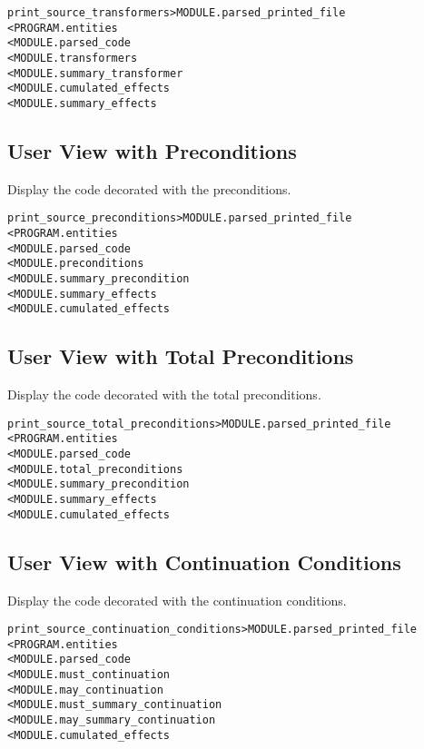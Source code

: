 \documentclass[a4paper]{report}
\newenvironment{PipsMake}{\begin{alltt}}{\end{alltt}}
\begin{document}
\begin{PipsMake}
print_source_transformers         > MODULE.parsed_printed_file
        < PROGRAM.entities
        < MODULE.parsed_code
        < MODULE.transformers
        < MODULE.summary_transformer
        < MODULE.cumulated_effects
        < MODULE.summary_effects
\end{PipsMake}

\subsection{User View with Preconditions}

Display the code decorated with the preconditions.

\begin{PipsMake}
print_source_preconditions        > MODULE.parsed_printed_file
        < PROGRAM.entities
        < MODULE.parsed_code
        < MODULE.preconditions
        < MODULE.summary_precondition
        < MODULE.summary_effects
        < MODULE.cumulated_effects
\end{PipsMake}

\subsection{User View with Total Preconditions}

Display the code decorated with the total preconditions.

\begin{PipsMake}
print_source_total_preconditions        > MODULE.parsed_printed_file
        < PROGRAM.entities
        < MODULE.parsed_code
        < MODULE.total_preconditions
        < MODULE.summary_precondition
        < MODULE.summary_effects
        < MODULE.cumulated_effects
\end{PipsMake}

\subsection{User View with Continuation Conditions}

Display the code decorated with the continuation conditions.

\begin{PipsMake}
print_source_continuation_conditions   > MODULE.parsed_printed_file
        < PROGRAM.entities
        < MODULE.parsed_code
        < MODULE.must_continuation
        < MODULE.may_continuation
        < MODULE.must_summary_continuation
        < MODULE.may_summary_continuation       
        < MODULE.cumulated_effects
\end{PipsMake}
\end{document}
